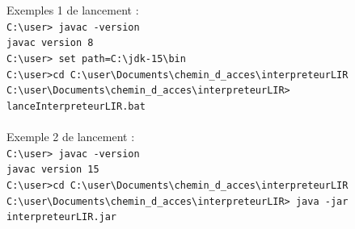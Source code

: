     Exemples 1 de lancement :
    \\ \verb|C:\user> javac -version|
    \\ \verb|javac version 8|
    \\ \verb|C:\user> set path=C:\jdk-15\bin|
    \\ \verb|C:\user>cd C:\user\Documents\chemin_d_acces\interpreteurLIR|
    \\ \verb|C:\user\Documents\chemin_d_acces\interpreteurLIR> lanceInterpreteurLIR.bat| \\
    \\ Exemple 2 de lancement :
    \\ \verb|C:\user> javac -version|
    \\ \verb|javac version 15|
    \\ \verb|C:\user>cd C:\user\Documents\chemin_d_acces\interpreteurLIR|
    \\ \verb|C:\user\Documents\chemin_d_acces\interpreteurLIR> java -jar interpreteurLIR.jar|






